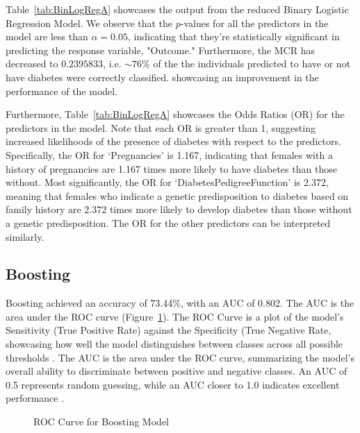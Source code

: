 \documentclass[12pt]{article}
\begin{document}
Table~\ref{tab:BinLogRegA} showcases the output from the reduced Binary Logistic Regression Model. We observe that the $p$-values for all the predictors in the model are less than $\alpha = 0.05$, indicating that they're statistically significant in predicting the response variable, "Outcome." Furthermore, the MCR has decreased to $0.2395833$, i.e. $\sim76\%$ of the the individuals predicted to have or not have diabetes were correctly classified. showcasing an improvement in the performance of the model. 

Furthermore, Table~\ref{tab:BinLogRegA} showcases the Odds Ratios (OR) for the predictors in the model. Note that each OR is greater than 1, suggesting increased likelihoods of the presence of diabetes with respect to the predictors. Specifically, the OR for ‘Pregnancies’ is 1.167, indicating that females with a history of pregnancies are 1.167 times more likely to have diabetes than those without. Most significantly, the OR for ‘DiabetesPedigreeFunction’ is 2.372, meaning that females who indicate a genetic predisposition to diabetes based on family history are 2.372 times more likely to develop diabetes than those without a genetic predisposition. The OR for the other predictors can be interpreted similarly. 

\subsection{Boosting}

\indent
\onehalfspacing

Boosting achieved an accuracy of 73.44\%, with an AUC of 0.802. The AUC is the area under the ROC curve (Figure~\ref{fig:roc}). The ROC Curve is a plot of the model’s Sensitivity (True Positive Rate) against the Specificity (True Negative Rate, showcasing how well the model distinguishes between classes across all possible thresholds \citep{fawcett2006introduction}. The AUC is the area under the ROC curve, summarizing the model's overall ability to discriminate between positive and negative classes. An AUC of 0.5 represents random guessing, while an AUC closer to 1.0 indicates excellent performance \citep{pROC,fawcett2006introduction}.

\begin{figure}[h!]
	\centering
	\caption{ROC Curve for Boosting Model}
	\label{fig:roc}
\end{figure}
\end{document}
